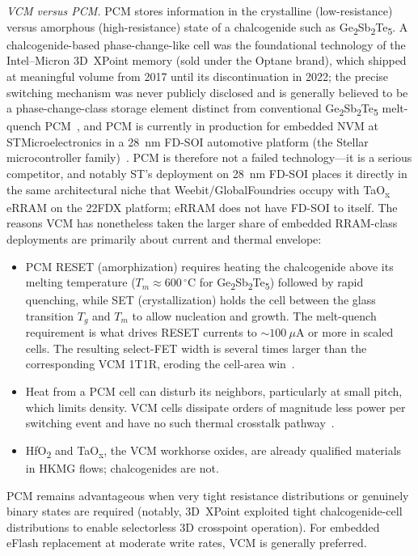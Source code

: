 \documentclass[lettersize,journal]{IEEEtran}
\begin{document}
\textit{VCM versus PCM.} PCM stores information in the crystalline (low-resistance) versus amorphous (high-resistance) state of a chalcogenide such as Ge\textsubscript{2}Sb\textsubscript{2}Te\textsubscript{5}. A chalcogenide-based phase-change-like cell was the foundational technology of the Intel--Micron 3D~XPoint memory (sold under the Optane brand), which shipped at meaningful volume from 2017 until its discontinuation in 2022; the precise switching mechanism was never publicly disclosed and is generally believed to be a phase-change-class storage element distinct from conventional Ge\textsubscript{2}Sb\textsubscript{2}Te\textsubscript{5} melt-quench PCM~\cite{ref_hellenbrand2024}, and PCM is currently in production for embedded NVM at STMicroelectronics in a 28~nm FD-SOI automotive platform (the Stellar microcontroller family)~\cite{ref_hellenbrand2024}. PCM is therefore not a failed technology---it is a serious competitor, and notably ST's deployment on 28~nm FD-SOI places it directly in the same architectural niche that Weebit/GlobalFoundries occupy with TaO\textsubscript{x} eRRAM on the 22FDX platform; eRRAM does not have FD-SOI to itself. The reasons VCM has nonetheless taken the larger share of embedded RRAM-class deployments are primarily about current and thermal envelope:
\begin{itemize}
\item PCM RESET (amorphization) requires heating the chalcogenide above its melting temperature ($T_m\!\approx\!600\,^\circ$C for Ge\textsubscript{2}Sb\textsubscript{2}Te\textsubscript{5}) followed by rapid quenching, while SET (crystallization) holds the cell between the glass transition $T_g$ and $T_m$ to allow nucleation and growth. The melt-quench requirement is what drives RESET currents to ${\sim}100~\mu$A or more in scaled cells. The resulting select-FET width is several times larger than the corresponding VCM 1T1R, eroding the cell-area win~\cite{ref_hellenbrand2024,ref_wong2012}.
\item Heat from a PCM cell can disturb its neighbors, particularly at small pitch, which limits density. VCM cells dissipate orders of magnitude less power per switching event and have no such thermal crosstalk pathway~\cite{ref_ielmini2016}.
\item HfO\textsubscript{2} and TaO\textsubscript{x}, the VCM workhorse oxides, are already qualified materials in HKMG flows; chalcogenides are not.
\end{itemize}
PCM remains advantageous when very tight resistance distributions or genuinely binary states are required (notably, 3D~XPoint exploited tight chalcogenide-cell distributions to enable selectorless 3D crosspoint operation). For embedded eFlash replacement at moderate write rates, VCM is generally preferred.
\end{document}
